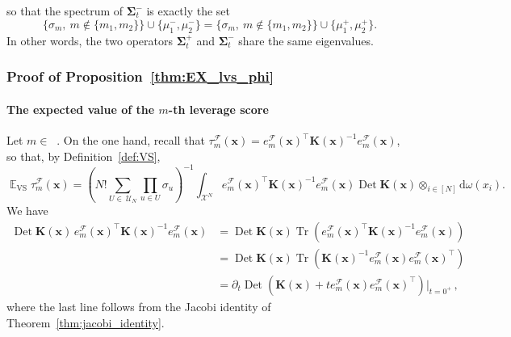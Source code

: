 \documentclass[twoside,11pt]{book}
\numberwithin{theorem}{chapter}
\numberwithin{definition}{chapter}
\numberwithin{proposition}{chapter}
\numberwithin{corollary}{chapter}
\numberwithin{example}{chapter}
\numberwithin{lemma}{chapter}
\DeclareMathOperator{\Tr}{Tr}
\DeclareMathOperator{\Det}{Det}
\DeclareMathOperator{\VS}{\mathrm{VS}}
\DeclareMathOperator{\Tran}{\intercal}
\DeclareMathOperator{\EX}{\mathbb{E}}
\DeclareMathOperator{\F}{\mathcal{F}}
\DeclareMathOperator{\Ns}{\mathbb{N}^{*}}
\def\UN{\:\mathcal{U}_N}
\begin{document}
so that the spectrum of $\bm{\Sigma}_{t}^{-}$ is exactly the set
\begin{equation}
\{ \sigma_{m}, \: m \notin  \{m_{1},m_{2}\}\} \cup \{\mu_{1}^{-}, \mu_{2}^{-} \} = \{ \sigma_{m}, \: m \notin  \{m_{1},m_{2}\}\} \cup \{\mu_{1}^{+}, \mu_{2}^{+} \}.
\end{equation}
In other words, the two operators $\bm{\Sigma}_{t}^{+}$ and $\bm{\Sigma}_{t}^{-}$ share the same eigenvalues.


\subsubsection{Proof of Proposition~\ref{thm:EX_lvs_phi}}\label{app:proof_EX_lvs_phi}
\paragraph{The expected value of the $m$-th leverage score \label{sec:proof_EX_VS_lvs_n_diff_phi}}
Let $m \in \Ns$. On the one hand, recall that $\tau_{m}^{\F}(\bm{x}) = e_{m}^{\mathcal{F}}(\bm{x})^{\Tran}\bm{K}(\bm{x})^{-1}e_{m}^{\mathcal{F}}(\bm{x})$, so that, by Definition~\ref{def:VS},
\begin{equation}
  \label{e:just_def_of_VS}
\EX_{\VS} \tau_{m}^{\F}(\bm{x}) = \left( N!\sum\limits_{U\in\UN}\prod\limits_{u \in U}\sigma_{u} \right)^{-1} \int_{\mathcal{X}^{N}} e_{m}^{\mathcal{F}}(\bm{x})^{\Tran}\bm{K}(\bm{x})^{-1}e_{m}^{\mathcal{F}}(\bm{x}) \Det \bm{K}(\bm{x}) \otimes_{i \in [N]} \mathrm{d}\omega(x_{i}).
\end{equation}
We have
\begin{align}
\Det \bm{K}(\bm{x})\,e_{m}^{\mathcal{F}}(\bm{x})^{\Tran}\bm{K}(\bm{x})^{-1}e_{m}^{\mathcal{F}}(\bm{x}) & = \Det \bm{K}(\bm{x})\Tr \left( e_{m}^{\mathcal{F}}(\bm{x})^{\Tran}\bm{K}(\bm{x})^{-1}e_{m}^{\mathcal{F}}(\bm{x}) \right) \nonumber \\
& = \Det \bm{K}(\bm{x})\Tr \left(\bm{K}(\bm{x})^{-1}e_{m}^{\mathcal{F}}(\bm{x})e_{m}^{\mathcal{F}}(\bm{x})^{\Tran}\right)\nonumber\\
&= \partial_{t} \Det (\bm{K}(\bm{x})+t e_{m}^{\mathcal{F}}(\bm{x})e_{m}^{\mathcal{F}}(\bm{x})^{\Tran})|_{t = 0^{+}}\,,\label{e:derivative_inside_the_integral}
\end{align}
where the last line follows from the Jacobi identity of Theorem~\ref{thm:jacobi_identity}.
\end{document}
